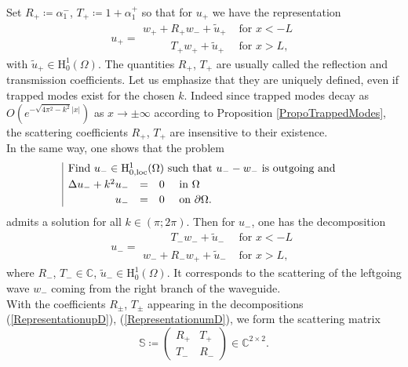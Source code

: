 \documentclass[11pt,a4paper]{report}
\newcommand{\Om}{\Omega}
\newcommand{\mrm}[1]{\mathrm{#1}}
\newcommand{\Cplx}{\mathbb{C}}
\newcommand{\mH}{\mrm{H}}
\newcommand{\loc}{\mbox{\scriptsize loc}}
\begin{document}
\noindent Set $R_+\coloneqq\alpha_1^-$, $T_+\coloneqq1+\alpha_1^+$ so that for $u_+$ we have the representation
\begin{equation}\label{RepresentationupD}
u_+=\begin{array}{|ll}
w_++R_+w_-+\tilde{u}_+ & \mbox{ for }x < - L \\[3pt]
\phantom{w_+mi}T_+w_++\tilde{u}_+ & \mbox{ for }x>L,
\end{array}
\end{equation}
with $\tilde{u}_+\in\mH^1_0(\Om)$. The quantities $R_+$, $T_+$ are usually called the reflection and transmission coefficients. Let us emphasize that they are uniquely defined, even if trapped modes exist for the chosen $k$. Indeed since trapped modes decay as $O(e^{-\sqrt{4\pi^2-k^2}|x|})$ as $x\to\pm\infty$ according to Proposition \ref{PropoTrappedModes}, the scattering coefficients $R_+$, $T_+$ are insensitive to their existence.\\
\newline
In the same way, one shows that the problem 
\[
\begin{array}{|rcll}
\multicolumn{4}{|l}{\mbox{Find }u_-\in\mH^1_{0,\loc}(\Om)\mbox{ such that }u_--w_-\mbox{ is outgoing and } }\\[3pt]
\Delta u_-+k^2u_-&=&0&\mbox{ in }\Om \\[2pt]
u_-&=&0&\mbox{ on }\partial\Om.
\end{array}
\]
admits a solution for all $k\in(\pi;2\pi)$. Then for $u_-$, one has the decomposition 
\begin{equation}\label{RepresentationumD}
u_-=\begin{array}{|ll}
\phantom{w_+mi}T_-w_-+\tilde{u}_- & \mbox{ for }x < - L \\[3pt]
w_-+R_-w_++\tilde{u}_- & \mbox{ for }x>L,
\end{array}
\end{equation}
where $R_-$, $T_-\in\Cplx$, $\tilde{u}_-\in\mH^1_0(\Om)$. It corresponds to the scattering of the leftgoing wave $w_-$ coming from the right branch of the waveguide.\\
\newline
With the coefficients $R_\pm$, $T_\pm$ appearing in the decompositions (\ref{RepresentationupD}), (\ref{RepresentationumD}), we form the scattering matrix
\[
\mathbb{S}\coloneqq\left( 
\begin{array}{cc}
R_+ & T_+ \\[2pt]
T_- & R_- 
\end{array}
\right)\in\Cplx^{2\times2}.
\]
\end{document}
